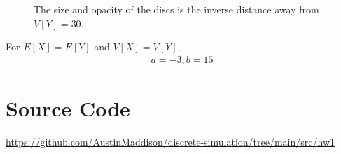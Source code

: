 \documentclass[twocolumn]{article}
\begin{document}
\vspace{-10pt}
\begin{figure}[H]
    \centering
    \vspace{-10pt}
    \caption{The size and opacity of the discs is the inverse distance away from $V[Y] = 30$.}
\end{figure}

\vspace{-10pt}
For $E[X]=E[Y]$ and $V[X]=V[Y]$,
\vspace{-10pt}
\begin{align*}
a=-3, b=15
\end{align*}


\section*{Source Code}
\href{https://github.com/AustinMaddison/discrete-simulation/tree/main/src/hw1}{https://github.com/AustinMaddison/discrete-simulation/tree/main/src/hw1}

%
%
\end{document}
